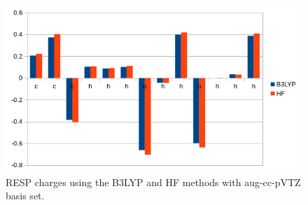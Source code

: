 \documentclass[10pt]{article}
\begin{document}
\begin{figure}[ht!]
\centering
\includegraphics[width=0.8\linewidth]{fig/resp}
\caption{RESP charges using the B3LYP and HF methods with aug-cc-pVTZ basis set.}
\label{fig:resp}
\end{figure}




\end{document}
